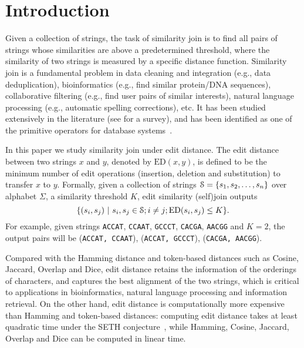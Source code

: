 \section{Introduction}
\label{sec:intro}

Given a collection of strings, the task of similarity join is to find all pairs of strings whose similarities are above a predetermined threshold, where the similarity of two strings is measured by a specific distance function. Similarity join is a fundamental problem in data cleaning and integration (e.g., data deduplication), bioinformatics (e.g., find similar protein/DNA sequences), collaborative filtering (e.g., find user pairs of similar interests), natural language processing (e.g., automatic spelling corrections), etc. It has been studied extensively in the literature (see \cite{JLFL14} for a survey), and has been identified as one of the primitive operators for database systems~\cite{CGK06}.

In this paper we study similarity join under edit distance.  The edit distance between two strings $x$ and $y$, denoted by $\text{ED}(x, y)$, is defined to be the minimum number of edit operations (insertion, deletion and substitution) to transfer $x$ to $y$.  Formally, given a collection of strings $\S = \{s_1, s_2, \ldots, s_n\}$ over alphabet $\Sigma$, a similarity threshold $K$, edit similarity (self)join outputs
$$\{(s_i, s_j)\ |\ s_i, s_j \in \S; i \neq j; \text{ED}(s_i, s_j) \le K\}.$$ For example, given strings  {\tt ACCAT}, {\tt CCAAT}, {\tt GCCCT}, {\tt CACGA}, {\tt AACGG} and $K = 2$, the output pairs will be  ({\tt ACCAT, CCAAT}), ({\tt ACCAT, GCCCT}), ({\tt CACGA, AACGG}).

Compared with the Hamming distance
and token-based distances such as Cosine,
Jaccard,
Overlap
and Dice,
edit distance retains the information of the orderings of characters, and captures the best alignment of the two strings, which is critical to applications in bioinformatics, natural language processing and information retrieval.  On the other hand, edit distance is computationally more expensive than Hamming and token-based distances: computing edit distance takes at least quadratic time under the SETH conjecture~\cite{BI15}, while Hamming, Cosine, Jaccard, Overlap and Dice can be computed in linear time.  


